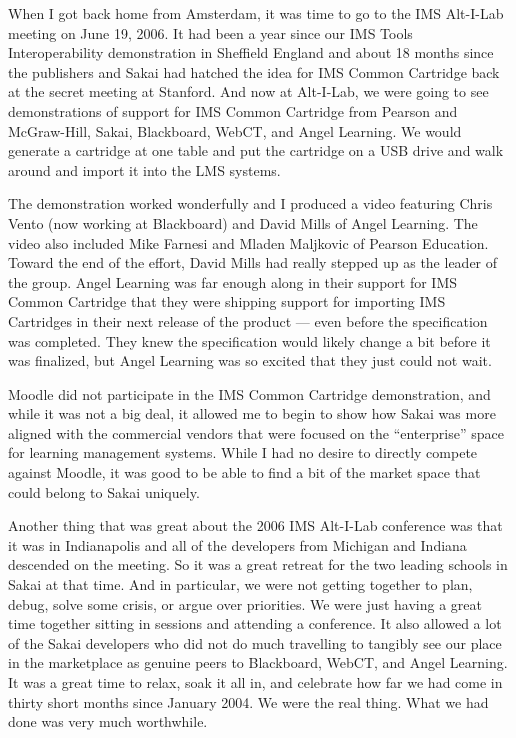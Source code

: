 \documentclass[12pt]{book}
\begin{document}

When I got back home from Amsterdam, it was time to go to the IMS
Alt-I-Lab meeting on June 19, 2006.   It had been a year since our IMS
Tools Interoperability demonstration in Sheffield England and about 18
months since the publishers and Sakai had hatched the idea for IMS Common
Cartridge back at the secret meeting at Stanford.   And now at Alt-I-Lab,
we were going to see demonstrations of support for IMS Common Cartridge
from Pearson and McGraw-Hill, Sakai, Blackboard, WebCT, and Angel Learning.
We would generate a cartridge at one table and put the cartridge on
a USB drive and walk around and import it into the LMS systems.

The demonstration worked wonderfully and I produced a video featuring
Chris Vento (now working at Blackboard) and David Mills
of Angel Learning.  The video also included Mike Farnesi and Mladen Maljkovic
of Pearson Education.   Toward the end of the effort, David Mills had
really stepped up as the leader of the group.   Angel Learning was
far enough along in their support for IMS Common Cartridge that they
were shipping support for importing IMS Cartridges in their next release
of the product --- even before the specification was completed.  They knew
the specification would likely change a bit before it was finalized,
but Angel Learning was so excited that they just could not wait.

Moodle did not participate in the IMS Common Cartridge demonstration,
and while it was not a big deal, it allowed me to begin to show how
Sakai was more aligned with the commercial vendors that were focused
on the ``enterprise'' space for learning management systems.  While
I had no desire to directly compete against Moodle, it was good to
be able to find a bit of the market space that could belong to Sakai
uniquely.

Another thing that was great about the 2006 IMS Alt-I-Lab conference
was that it was in Indianapolis and all of the developers from
Michigan and Indiana descended on the meeting.   So it was a great
retreat for the two leading schools in Sakai at that time.  And in
particular, we were not getting together to plan, debug, solve some crisis,
or argue over priorities.   We were just having a great time together
sitting in sessions and attending a conference.
It also allowed a lot of the Sakai developers who did not do much
travelling
to tangibly see our place in the marketplace as genuine peers to
Blackboard, WebCT, and Angel Learning.  It was a great time to relax,
soak it all in, and celebrate how far we had come in thirty short
months since January 2004.  We were the real thing.  What we had done was
very much worthwhile.
\end{document}
